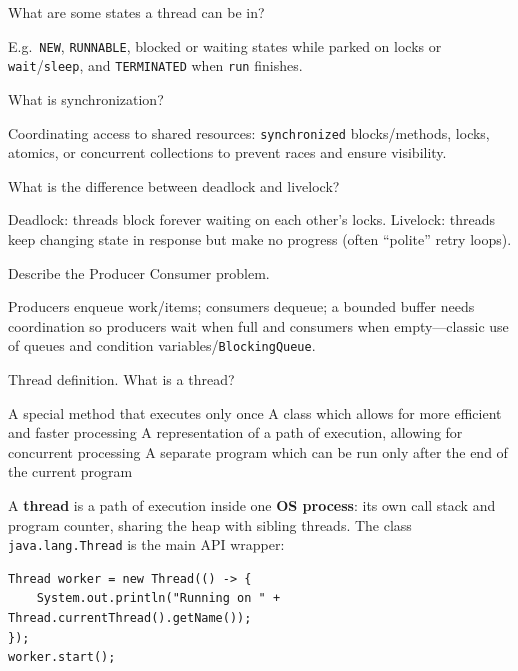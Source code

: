 \question[4]
What are some states a thread can be in?
\begin{solutionorbox}[1.2in]
  E.g.\ \texttt{NEW}, \texttt{RUNNABLE}, blocked or waiting states while parked on locks or \texttt{wait}/\texttt{sleep}, and \texttt{TERMINATED} when \texttt{run} finishes.
\end{solutionorbox}

\question[4]
What is synchronization?
\begin{solutionorbox}[1.2in]
  Coordinating access to shared resources: \texttt{synchronized} blocks/methods, locks, atomics, or concurrent collections to prevent races and ensure visibility.
\end{solutionorbox}

\question[4]
What is the difference between deadlock and livelock?
\begin{solutionorbox}[1.25in]
  Deadlock: threads block forever waiting on each other's locks. Livelock: threads keep changing state in response but make no progress (often ``polite'' retry loops).
\end{solutionorbox}

\question[4]
Describe the Producer Consumer problem.
\begin{solutionorbox}[1.35in]
  Producers enqueue work/items; consumers dequeue; a bounded buffer needs coordination so producers wait when full and consumers when empty---classic use of queues and condition variables/\texttt{BlockingQueue}.
\end{solutionorbox}

\newpage


\question[4]
Thread definition. What is a thread?
\begin{choices}
  \choice A special method that executes only once
  \choice A class which allows for more efficient and faster processing
  \CorrectChoice A representation of a path of execution, allowing for concurrent processing
  \choice A separate program which can be run only after the end of the current program
\end{choices}
\begin{solution}
  A \textbf{thread} is a path of execution inside one \textbf{OS process}: its own call stack and program counter, sharing the heap with sibling threads. The class \texttt{java.lang.Thread} is the main API wrapper:

\begin{lstlisting}[style=java]
Thread worker = new Thread(() -> {
    System.out.println("Running on " + Thread.currentThread().getName());
});
worker.start();
\end{lstlisting}
\end{solution}

